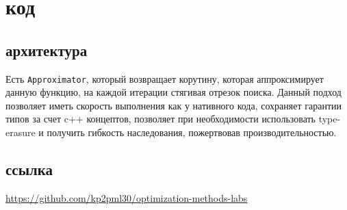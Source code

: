 \documentclass[russian, english]{article}
\def\code#1{\texttt{#1}}
\begin{document}
\newpage
\appendix
\section{код}
\subsection{архитектура}
Есть \code{Approximator}, который возвращает корутину, которая аппроксимирует данную функцию, на каждой итерации стягивая отрезок поиска. Данный подход позволяет иметь скорость выполнения как у нативного кода, сохраняет гарантии типов за счет c++ концептов, позволяет при необходимости использовать type-erasure и получить гибкость наследования, пожертвовав производительностью.

\subsection{ссылка}
\url{https://github.com/kp2pml30/optimization-methods-labs}
\end{document}
